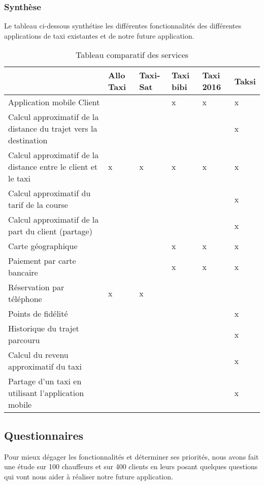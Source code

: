 {\subsubsection{Synthèse}

Le tableau ci-dessous synthétise les différentes fonctionnalités des différentes applications de taxi existantes et de notre future application.\\

\begin{table}[H]
\centering
\begin{tabular}{|m{5.5cm}|m{1.7cm}|m{1.7cm}|m{1.7cm}|m{1.8cm}|m{1.7cm}|}
\hline 
  & \textbf{Allo Taxi}& \textbf{Taxi-Sat} & \textbf{Taxi bibi} & \textbf{Taxi 2016} & \textbf{Taksi} \\ 
\hline 
Application mobile Client &  &  & x & x & x \\ 
\hline 
Calcul approximatif de la distance du trajet vers la destination &  &  &  &  & x \\ 
\hline 
Calcul approximatif de la distance entre le client et le taxi & x & x & x & x & x \\ 
\hline 
Calcul approximatif du tarif de la course &  &  &  &  & x \\ 
\hline 
Calcul approximatif de la part du client  (partage) &  &  &  &  & x \\ 
\hline 
Carte géographique &  &  & x & x & x \\ 
\hline 
Paiement par carte bancaire &  &  & x & x & x \\ 
\hline 
Réservation par téléphone & x & x &  &  &  \\ 
\hline 
Points de fidélité &  &  &  &  & x \\ 
\hline 
Historique du trajet parcouru &  &  &  &  & x \\ 
\hline 
Calcul du revenu approximatif du taxi &  &  &  &  & x \\ 
\hline 
Partage d'un taxi en utilisant l'application mobile &  &  &  &  & x \\ 
\hline 
\end{tabular} 
\caption{Tableau comparatif des services}
\end{table}

\subsection{Questionnaires}
Pour mieux dégager les fonctionnalités et déterminer ses priorités, nous avons fait une étude sur 100 chauffeurs et sur 400 clients en leurs posant quelques questions qui vont nous aider à réaliser notre future application.\\

}
